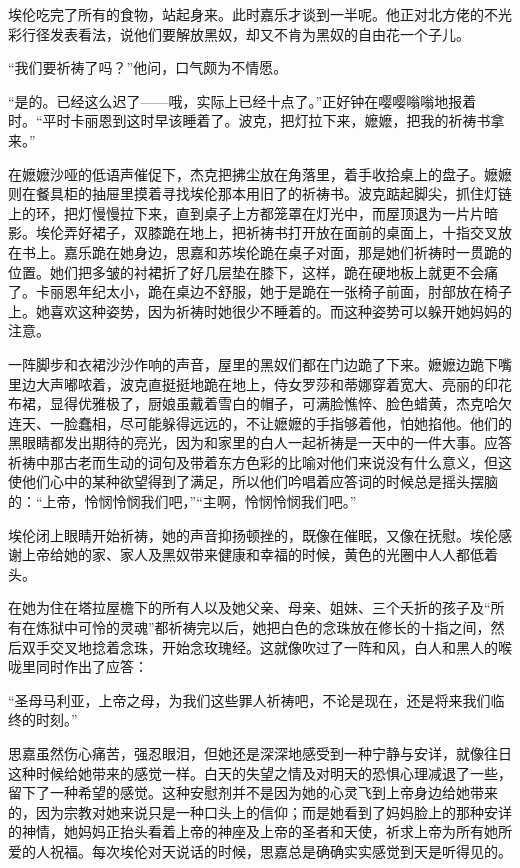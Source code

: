 \par 埃伦吃完了所有的食物，站起身来。此时嘉乐才谈到一半呢。他正对北方佬的不光彩行径发表看法，说他们要解放黑奴，却又不肯为黑奴的自由花一个子儿。
\par “我们要祈祷了吗？”他问，口气颇为不情愿。
\par “是的。已经这么迟了——哦，实际上已经十点了。”正好钟在嘤嘤嗡嗡地报着时。“平时卡丽恩到这时早该睡着了。波克，把灯拉下来，嬷嬷，把我的祈祷书拿来。”
\par 在嬷嬷沙哑的低语声催促下，杰克把拂尘放在角落里，着手收拾桌上的盘子。嬷嬷则在餐具柜的抽屉里摸着寻找埃伦那本用旧了的祈祷书。波克踮起脚尖，抓住灯链上的环，把灯慢慢拉下来，直到桌子上方都笼罩在灯光中，而屋顶退为一片片暗影。埃伦弄好裙子，双膝跪在地上，把祈祷书打开放在面前的桌面上，十指交叉放在书上。嘉乐跪在她身边，思嘉和苏埃伦跪在桌子对面，那是她们祈祷时一贯跪的位置。她们把多皱的衬裙折了好几层垫在膝下，这样，跪在硬地板上就更不会痛了。卡丽恩年纪太小，跪在桌边不舒服，她于是跪在一张椅子前面，肘部放在椅子上。她喜欢这种姿势，因为祈祷时她很少不睡着的。而这种姿势可以躲开她妈妈的注意。
\par 一阵脚步和衣裙沙沙作响的声音，屋里的黑奴们都在门边跪了下来。嬷嬷边跪下嘴里边大声嘟哝着，波克直挺挺地跪在地上，侍女罗莎和蒂娜穿着宽大、亮丽的印花布裙，显得优雅极了，厨娘虽戴着雪白的帽子，可满脸憔悴、脸色蜡黄，杰克哈欠连天、一脸蠢相，尽可能躲得远远的，不让嬷嬷的手指够着他，怕她掐他。他们的黑眼睛都发出期待的亮光，因为和家里的白人一起祈祷是一天中的一件大事。应答祈祷中那古老而生动的词句及带着东方色彩的比喻对他们来说没有什么意义，但这使他们心中的某种欲望得到了满足，所以他们吟唱着应答词的时候总是摇头摆脑的：“上帝，怜悯怜悯我们吧，”“主啊，怜悯怜悯我们吧。”
\par 埃伦闭上眼睛开始祈祷，她的声音抑扬顿挫的，既像在催眠，又像在抚慰。埃伦感谢上帝给她的家、家人及黑奴带来健康和幸福的时候，黄色的光圈中人人都低着头。
\par 在她为住在塔拉屋檐下的所有人以及她父亲、母亲、姐妹、三个夭折的孩子及“所有在炼狱中可怜的灵魂”都祈祷完以后，她把白色的念珠放在修长的十指之间，然后双手交叉地捻着念珠，开始念玫瑰经。这就像吹过了一阵和风，白人和黑人的喉咙里同时作出了应答：
\par “圣母马利亚，上帝之母，为我们这些罪人祈祷吧，不论是现在，还是将来我们临终的时刻。”
\par 思嘉虽然伤心痛苦，强忍眼泪，但她还是深深地感受到一种宁静与安详，就像往日这种时候给她带来的感觉一样。白天的失望之情及对明天的恐惧心理减退了一些，留下了一种希望的感觉。这种安慰剂并不是因为她的心灵飞到上帝身边给她带来的，因为宗教对她来说只是一种口头上的信仰；而是她看到了妈妈脸上的那种安详的神情，她妈妈正抬头看着上帝的神座及上帝的圣者和天使，祈求上帝为所有她所爱的人祝福。每次埃伦对天说话的时候，思嘉总是确确实实感觉到天是听得见的。
